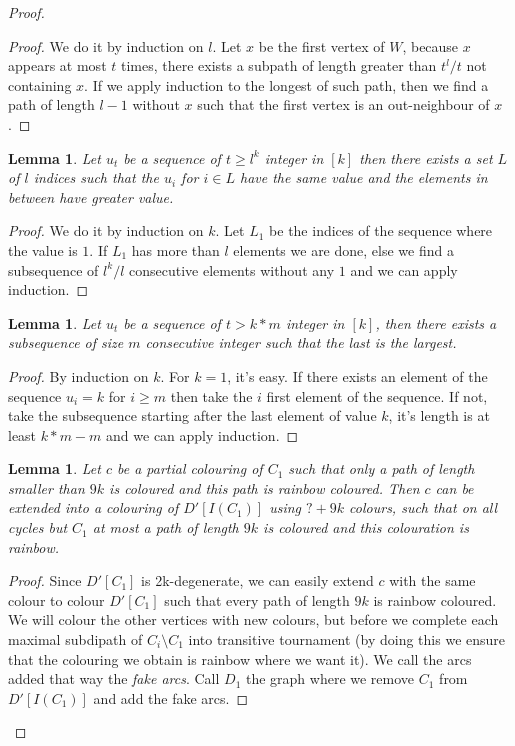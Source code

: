 \documentclass[utf8,10pt]{article}
\theoremstyle{plain}
\newtheorem{lemma}[theorem]{Lemma}
\theoremstyle{definition}
\theoremstyle{remark}
\begin{document}
\begin{proof}
\begin{proof}
We do it by induction on $l$. Let $x$ be the first vertex of $W$, because $x$ appears at most $t$ times, there exists a subpath of length greater
than $t^l/t$ not containing $x$. If we apply induction to the longest of such path, then we find a path of length $l-1$ without $x$ such that
 the first vertex is an out-neighbour of $x$.

\end{proof}

\begin{lemma}\label{min}
Let $u_t$ be a sequence of $t \geq l^k$ integer in $[k]$ then there exists a set $L$ of $l$ indices such that the $u_i$ for $i \in L$ have the same value
and the elements in between have greater value.
\end{lemma}

\begin{proof}
We do it by induction on $k$. Let $L_1$ be the indices of the sequence where the value is $1$. If $L_1$ has more than $l$ elements we are done,
else we find a subsequence of $l^k/l$ consecutive elements without any $1$ and we can apply induction.
\end{proof}

\begin{lemma}\label{max}
Let $u_t$ be a sequence of $t > k*m$ integer in $[k]$, then there exists a subsequence of size $m$ consecutive integer such that the
last is the largest.
\end{lemma}

\begin{proof}
By induction on $k$. For $k = 1$, it's easy.
If there exists an element of the sequence $u_i = k$ for $i \geq m$ then take the $i$ first element of the sequence.
If not, take the subsequence starting after the last element of value $k$, it's length is at least $k*m - m$ and we can apply induction.
\end{proof}

\begin{lemma}\label{IC}
Let $c$ be a partial colouring of $C_1$ such that only a path of length smaller than
$9k$ is coloured and this path is rainbow coloured. Then $c$ can be extended into
a colouring of $D'[I(C_1)]$ using $? + 9k$ colours, such that on all cycles but $C_1$ at most a path of length $9k$ is
coloured and this colouration is rainbow.
\end{lemma}

\begin{proof}
Since $D'[C_1]$ is 2k-degenerate, we can easily extend $c$ with the same colour to colour $D'[C_1]$
such that every path of length $9k$ is rainbow coloured.
We will colour the other vertices with  new colours, but before we complete each maximal
subdipath of $C_i \setminus C_1$ into transitive tournament
(by doing this we ensure that the colouring we obtain is rainbow where we want it). We call the arcs added that way the \textit{fake arcs}.
Call $D_1$ the graph where we remove $C_1$ from $D'[I(C_1)]$ and add the fake arcs.


\end{proof}
\end{proof}
\end{document}
